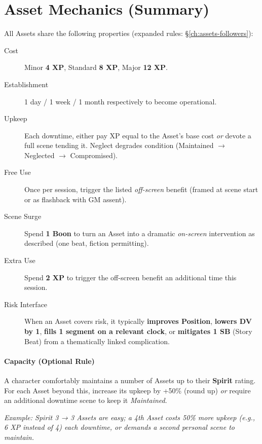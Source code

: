 \section{Asset Mechanics (Summary)}
All Assets share the following properties (expanded rules: \S\ref{ch:assets-followers}):
\begin{description}
  \item[Cost] Minor \textbf{4 XP}, Standard \textbf{8 XP}, Major \textbf{12 XP}. 
  \item[Establishment] 1 day / 1 week / 1 month respectively to become operational.
  \item[Upkeep] Each downtime, either pay XP equal to the Asset's base cost \emph{or} devote a full scene tending it. Neglect degrades condition (Maintained $\rightarrow$ Neglected $\rightarrow$ Compromised). 
  \item[Free Use] Once per session, trigger the listed \emph{off-screen} benefit (framed at scene start or as flashback with GM assent).
  \item[Scene Surge] Spend \textbf{1 Boon} to turn an Asset into a dramatic \emph{on-screen} intervention as described (one beat, fiction permitting). 
  \item[Extra Use] Spend \textbf{2 XP} to trigger the off-screen benefit an additional time this session.
  \item[Risk Interface] When an Asset covers risk, it typically \textbf{improves Position}, \textbf{lowers DV by 1}, \textbf{fills 1 segment on a relevant clock}, or \textbf{mitigates 1 SB} (Story Beat) from a thematically linked complication. 
\end{description}

\paragraph{Capacity (Optional Rule)}
A character comfortably maintains a number of Assets up to their \textbf{Spirit} rating. For each Asset beyond this, increase its upkeep by +50\% (round up) \emph{or} require an additional downtime scene to keep it \emph{Maintained}.

\emph{Example: Spirit 3 → 3 Assets are easy; a 4th Asset costs 50\% more upkeep (e.g., 6 XP instead of 4) each downtime, or demands a second personal scene to maintain.}

